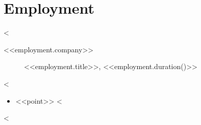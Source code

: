 \section{Employment}
<%
\begin{description}
    \item [<<employment.company>>] <<employment.title>>, <<employment.duration()>>
    \item [\footnotesize{
    <%
    }]
\end{description}
\begin{itemize}
    <%
    \item <<point>>
    <%
\end{itemize}
<%